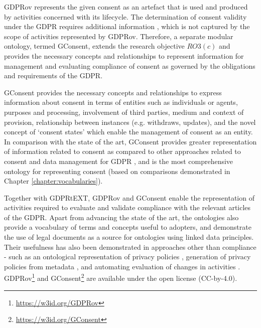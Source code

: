 GDPRov represents the given consent as an artefact that is used and produced by activities concerned with its lifecycle. The determination of consent validity under the GDPR requires additional information \cite{politou_forgetting_2018,article_29_data_protection_working_party_guidelines_2018}, which is not captured by the scope of activities represented by GDPRov. Therefore, a separate modular ontology, termed GConsent, extends the research objective $RO3(c)$ and provides the necessary concepts and relationships to represent information for management and evaluating compliance of consent as governed by the obligations and requirements of the GDPR.

GConsent provides the necessary concepts and relationships to express information about consent in terms of entities such as individuals or agents, purposes and processing, involvement of third parties, medium and context of provision, relationship between instances (e.g. withdraws, updates), and the novel concept of `consent states' which enable the management of consent as an entity. 
In comparison with the state of the art, GConsent provides greater representation of information related to consent as compared to other approaches related to consent and data management for GDPR \cite{peras_guidelines_2018}, and is the most comprehensive ontology for representing consent (based on comparisons demonstrated in Chapter \ref{chapter:vocabularies}).

Together with GDPRtEXT, GDPRov and GConsent enable the representation of activities required to evaluate and validate compliance with the relevant articles of the GDPR. Apart from advancing the state of the art, the ontologies also provide a vocabulary of terms and concepts useful to adopters, and demonstrate the use of legal documents as a source for ontologies using linked data principles.
Their usefulness has also been demonstrated in approaches other than compliance - such as an ontological representation of privacy policies \cite{pandit_ontology_2018}, generation of privacy policies from metadata \cite{pandit_personalised_2018}, and automating evaluation of changes in activities \cite{pandit_gdpr-driven_2018}.
GDPRov\footnote{\url{https://w3id.org/GDPRov}} and GConsent\footnote{\url{https://w3id.org/GConsent}} are available under the open license (CC-by-4.0).

